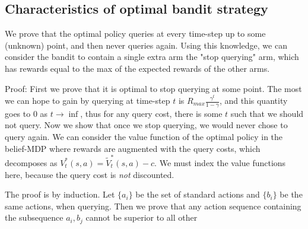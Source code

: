 \documentclass{article}
\begin{document}
\subsection{Characteristics of optimal bandit strategy}
We prove that the optimal policy queries at every time-step up to some (unknown) point, and then never queries again.
Using this knowledge, we can consider the bandit to contain a single extra arm the "stop querying" arm, which has rewards equal to the max of the expected rewards of the other arms.

Proof: 
First we prove that it is optimal to stop querying at some point.
The most we can hope to gain by querying at time-step $t$ is $R_{max} \frac{\gamma^t}{1 - \gamma}$, and this quantity goes to 0 as $t \rightarrow \inf$, thus for any query cost, there is some $t$ such that we should not query.
%
Now we show that once we stop querying, we would never chose to query again.  
We can consider the value function of the optimal policy in the belief-MDP where rewards are augmented with the query costs, which decomposes as
$V_t^*(s,a) = \tilde{V}_t^*(s,a) - c$. %
We must index the value functions here, because the query cost is \emph{not} discounted.

The proof is by induction.
Let $\{a_i\}$ be the set of standard actions and $\{b_i\}$ be the same actions, when querying.
Then we prove that any action sequence containing the subsequence $a_i, b_j$ cannot be superior to all other 












%

\end{document}
